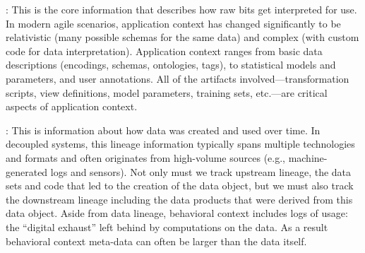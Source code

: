 \documentclass{sig-alternate}
\begin{document}

: This is the core information that describes how raw bits get interpreted for use. 
In modern agile scenarios, application context has changed significantly to be relativistic (many possible schemas for the same data) and complex (with custom code for data interpretation). 
Application context ranges from basic data descriptions (encodings, schemas, ontologies, tags), to statistical models and parameters, and user annotations.  
All of the artifacts involved---transformation scripts, view definitions, model parameters, training sets, etc.---are critical aspects of application context. 

: This is information about how data was created and used over time. 
In decoupled systems, this lineage information typically spans multiple technologies and formats and often originates from high-volume sources (e.g., machine-generated logs and sensors).
Not only must we track upstream lineage,
the data sets and code that led to the creation of the data object, but we must also track the 
downstream lineage including the data products that were derived from this data object. 
Aside from data lineage, behavioral context includes logs of usage: the ``digital exhaust'' left behind by computations on the data. 
As a result behavioral context meta-data can 
often be larger than the data itself. 
\end{document}
